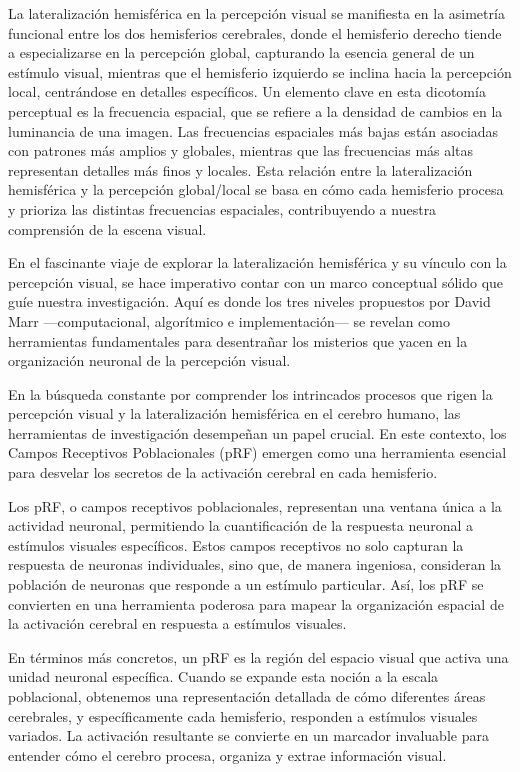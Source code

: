 \documentclass{article}
\begin{document}
	La lateralización hemisférica en la percepción visual se manifiesta en la asimetría funcional entre los dos hemisferios cerebrales, donde el hemisferio derecho tiende a especializarse en la percepción global, capturando la esencia general de un estímulo visual, mientras que el hemisferio izquierdo se inclina hacia la percepción local, centrándose en detalles específicos. Un elemento clave en esta dicotomía perceptual es la frecuencia espacial, que se refiere a la densidad de cambios en la luminancia de una imagen. Las frecuencias espaciales más bajas están asociadas con patrones más amplios y globales, mientras que las frecuencias más altas representan detalles más finos y locales. Esta relación entre la lateralización hemisférica y la percepción global/local se basa en cómo cada hemisferio procesa y prioriza las distintas frecuencias espaciales, contribuyendo a nuestra comprensión de la escena visual.
	
	En el fascinante viaje de explorar la lateralización hemisférica y su vínculo con la percepción visual, se hace imperativo contar con un marco conceptual sólido que guíe nuestra investigación. Aquí es donde los tres niveles propuestos por David Marr —computacional, algorítmico e implementación— se revelan como herramientas fundamentales para desentrañar los misterios que yacen en la organización neuronal de la percepción visual.
	
	En la búsqueda constante por comprender los intrincados procesos que rigen la percepción visual y la lateralización hemisférica en el cerebro humano, las herramientas de investigación desempeñan un papel crucial. En este contexto, los Campos Receptivos Poblacionales (pRF) emergen como una herramienta esencial para desvelar los secretos de la activación cerebral en cada hemisferio.
	
	Los pRF, o campos receptivos poblacionales, representan una ventana única a la actividad neuronal, permitiendo la cuantificación de la respuesta neuronal a estímulos visuales específicos. Estos campos receptivos no solo capturan la respuesta de neuronas individuales, sino que, de manera ingeniosa, consideran la población de neuronas que responde a un estímulo particular. Así, los pRF se convierten en una herramienta poderosa para mapear la organización espacial de la activación cerebral en respuesta a estímulos visuales.
	
	En términos más concretos, un pRF es la región del espacio visual que activa una unidad neuronal específica. Cuando se expande esta noción a la escala poblacional, obtenemos una representación detallada de cómo diferentes áreas cerebrales, y específicamente cada hemisferio, responden a estímulos visuales variados. La activación resultante se convierte en un marcador invaluable para entender cómo el cerebro procesa, organiza y extrae información visual.
	
\end{document}
